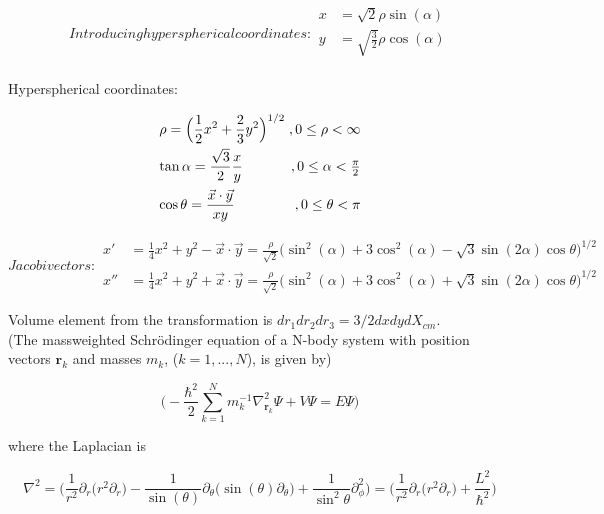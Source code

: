 \documentclass{article}
\begin{document}
\begin{subequations}
Introducing hyperspherical coordinates:
\begin{align}
        x &= \sqrt{2} \rho \sin(\alpha)\\
        y &= \sqrt{\frac{3}{2}} \rho \cos(\alpha)\\
\end{align}
\end{subequations}

Hyperspherical coordinates:
\[\arraycolsep=1.4pt\def\arraystretch{2.2}
     \left. \begin{array}{lr}
        \rho = \displaystyle \Big( \frac{1}{2}x^2 + \frac{2}{3}y^2 \Big) ^{1/2} &,  0\leq \rho < \infty\\
        \tan{\alpha} = \displaystyle \frac{\sqrt{3}}{2} \frac{x}{y} &,  0\leq \alpha < \frac{\pi}{2}\\
        \cos{\theta} = \displaystyle \frac{\vec{x} \cdot \vec{y}}{xy} &,  0\leq \theta < \pi
        \end{array}\right.
  \]

\begin{subequations}
Jacobi vectors:
\begin{align}
        x' &= \frac{1}{4} x^2 +y^2 -\vec{x} \cdot \vec{y} = \frac{\rho}{\sqrt{2}} \big( \sin^2(\alpha) + 3\cos^2(\alpha) - \sqrt{3}\sin(2\alpha)\cos{\theta}\big)^{1/2}\\
        x'' &= \frac{1}{4} x^2 +y^2 +\vec{x} \cdot \vec{y} = \frac{\rho}{\sqrt{2}} \big( \sin^2(\alpha) + 3\cos^2(\alpha) + \sqrt{3}\sin(2\alpha)\cos{\theta}\big)^{1/2}
\end{align}
\end{subequations}

Volume element from the transformation is $dr_1dr_2dr_3=3/2dxdydX_{cm}$.\\


(The massweighted Schr{\"o}dinger equation of a N-body system with position vectors $\bm{r}_k$ and masses $m_k$, ($k=1,...,N$), is given by)

\begin{equation}
\Bigg(-\frac{\hbar^2}{2} \sum_{k=1}^{N} m^{-1}_{k} \nabla^{2}_{\bm{r}_{k}} \Psi + V\Psi = E \Psi \Bigg)
\end{equation}

where the Laplacian is

\begin{equation}
\nabla^{2} = \Big( \frac{1}{r^2}\partial_{r} \big(r^2 \partial_{r}\big) - \frac{1}{\sin(\theta)} \partial_{\theta} \big( \sin(\theta) \partial_{\theta} \big) + \frac{1}{\sin^2{\theta}} \partial^{2}_{\phi} \Big) = \Big( \frac{1}{r^2} \partial_{r} \big( r^2 \partial_{r} \big) + \frac{L^2}{\hbar^2} \Big)
\end{equation}
\end{document}
